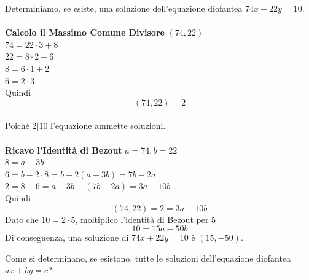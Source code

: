 \documentclass[a4paper,12pt, oneside]{book}
\begin{document}
	\begin{shaded}
		\begin{esempio}
			Determiniamo, se esiste, una soluzione dell'equazione diofantea $74x+22y=10$.\\\\
			\textbf{Calcolo il Massimo Comune Divisore} $(74,22)$\\
			$74 = 22 \cdot 3 + 8$\\
			$22 = 8 \cdot 2 + 6$\\
			$8=6 \cdot 1 + 2$\\
			$6 = 2 \cdot 3$\\
			Quindi $$(74,22)=2$$\\
			Poiché $2|10$ l'equazione ammette soluzioni.\\\\
			\textbf{Ricavo l'Identità di Bezout} $a=74, b=22$\\
			$8 = a- 3b$\\
			$6 = b-2 \cdot 8 = b -2(a-3b) = 7b-2a$\\
			$2 = 8-6=a-3b-(7b-2a)=3a-10b$\\
			Quindi $$(74,22) = 2 = 3a-10b$$
			Dato che $10 = 2 \cdot 5$, moltiplico l'identità di Bezout per 5
			$$10 = 15a -50b$$
			Di conseguenza, una soluzione di $74x+22y=10$ è $(15,-50)$.
		\end{esempio}
	\end{shaded}
	Come si determinano, se esistono, tutte le soluzioni dell'equazione diofantea $ax+by=c$?
\end{document}

